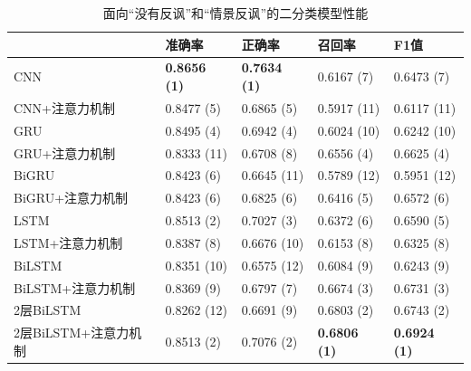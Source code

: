 \begin{table}[htb]
  \centering
  \begin{minipage}[t]{\linewidth}
  \caption{面向“没有反讽”和“情景反讽”的二分类模型性能}
  \label{tab:exp_irony_det_Bb02_result}
    \begin{tabularx}{\linewidth}{X|llll}
    \toprule[1.5pt]
    & 准确率 & 正确率 & 召回率 & F1值 \\
    \hline
    CNN & \bf 0.8656 (1) & \bf 0.7634 (1) & 0.6167 (7) & 0.6473 (7) \\ %
    CNN+注意力机制 & 0.8477 (5) & 0.6865 (5) & 0.5917 (11) & 0.6117 (11) \\ %
    \hline
    GRU & 0.8495 (4) & 0.6942 (4) & 0.6024 (10) & 0.6242 (10) \\ %
    GRU+注意力机制 & 0.8333 (11) & 0.6708 (8) & 0.6556 (4) & 0.6625 (4) \\ %
    \hline
    BiGRU & 0.8423 (6) & 0.6645 (11) & 0.5789 (12) & 0.5951 (12) \\ %
    BiGRU+注意力机制 & 0.8423 (6) & 0.6825 (6) & 0.6416 (5) & 0.6572 (6) \\ %
    \hline
    LSTM & 0.8513 (2) & 0.7027 (3) & 0.6372 (6) & 0.6590 (5) \\ %
    LSTM+注意力机制 & 0.8387 (8) & 0.6676 (10) & 0.6153 (8) & 0.6325 (8) \\ %
    \hline
    BiLSTM & 0.8351 (10) & 0.6575 (12) & 0.6084 (9) & 0.6243 (9) \\ %
    BiLSTM+注意力机制 & 0.8369 (9) & 0.6797 (7) & 0.6674 (3) & 0.6731 (3) \\ %
    \hline
    2层BiLSTM & 0.8262 (12) & 0.6691 (9) & 0.6803 (2) & 0.6743 (2) \\ %
    2层BiLSTM+注意力机制 & 0.8513 (2) & 0.7076 (2) & \bf 0.6806 (1) & \bf 0.6924 (1) \\ %
    \bottomrule[1.5pt]
    \end{tabularx}
  \end{minipage}
\end{table}


